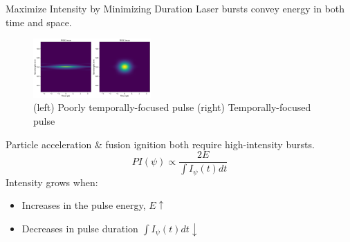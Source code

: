 \documentclass{beamer}
\newcommand{\highlight}[1]{\textcolor{myprimary}{#1}}
\newcommand{\notebox}[1]{\colorbox{myprimary!30}{#1}}
\begin{document}
\begin{frame}{Maximize Intensity by Minimizing Duration}
    Laser bursts convey energy in both \highlight{time} and \highlight{space}.
    \begin{figure}
        \includegraphics[width=0.4\textwidth]{images/frogs.png}
        \caption{(left) Poorly temporally-focused pulse (right) Temporally-focused pulse}
    \end{figure}
    Particle acceleration \& fusion ignition both require high-intensity bursts.
    \[
        PI(\psi) \propto \frac{2E}{\int I_\psi(t) dt}
    \]
    \highlight{Intensity grows when:}
    \begin{itemize}
        \item Increases in the pulse energy, $E \uparrow$
        \item Decreases in pulse duration \notebox{$\int I_\psi(t) dt \downarrow$}
    \end{itemize}
\end{frame}
\end{document}
